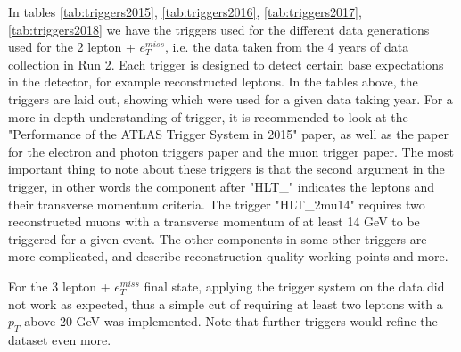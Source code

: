 In tables \ref{tab:triggers2015}, \ref{tab:triggers2016}, \ref{tab:triggers2017}, \ref{tab:triggers2018} we have the triggers used for
the different data generations used for the 2 lepton + $e_T^{miss}$, i.e. the data taken from the 4 years of data collection in Run 2. 
Each trigger is designed to detect certain base expectations in the detector, for example reconstructed leptons. In the tables above,
the triggers are laid out, showing which were used for a given data taking year. For a more in-depth understanding of trigger, 
it is recommended to look at the "Performance of the ATLAS Trigger System in 2015" paper\cite{triggersystem}, as well as the paper 
for the electron and photon triggers paper\cite{elec_photon} and the muon trigger paper\cite{muon}. The most important thing to note 
about these triggers is that the second argument in the trigger, in other words the component after "HLT\_" indicates the 
leptons and their transverse momentum criteria. The trigger "HLT\_2mu14" requires two reconstructed muons with a transverse momentum 
of at least 14 GeV to be triggered for a given event. The other components in some other triggers are more complicated, and 
describe reconstruction quality working points and more. \par 
For the 3 lepton + $e_T^{miss}$ final state, applying the trigger system on the data did not work as expected, thus a simple cut of requiring 
at least two leptons with a $p_T$ above 20 GeV was implemented. Note that further triggers would refine the dataset even more. 








